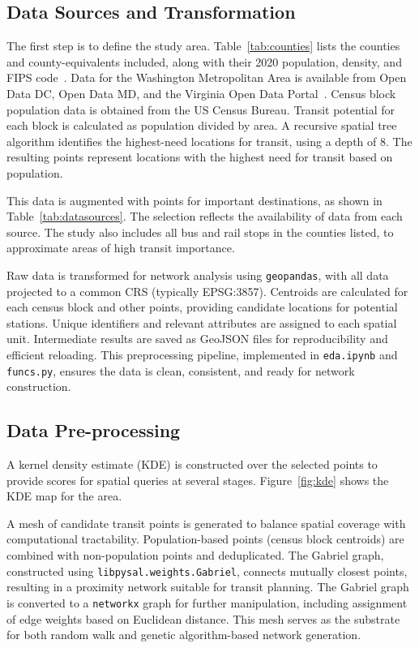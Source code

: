 \documentclass[manuscript]{acmart}
\begin{document}
\subsection{Data Sources and Transformation}
The first step is to define the study area. Table~\ref{tab:counties} lists the counties and county-equivalents included, along with their 2020 population, density, and FIPS code~\cite{lit:census}. Data for the Washington Metropolitan Area is available from Open Data DC, Open Data MD, and the Virginia Open Data Portal~\cite{lit:opendata}. Census block population data is obtained from the US Census Bureau. Transit potential for each block is calculated as population divided by area. A recursive spatial tree algorithm identifies the highest-need locations for transit, using a depth of 8. The resulting points represent locations with the highest need for transit based on population.

This data is augmented with points for important destinations, as shown in Table~\ref{tab:datasources}. The selection reflects the availability of data from each source. The study also includes all bus and rail stops in the counties listed, to approximate areas of high transit importance.

Raw data is transformed for network analysis using \texttt{geopandas}, with all data projected to a common CRS (typically EPSG:3857). Centroids are calculated for each census block and other points, providing candidate locations for potential stations. Unique identifiers and relevant attributes are assigned to each spatial unit. Intermediate results are saved as GeoJSON files for reproducibility and efficient reloading. This preprocessing pipeline, implemented in \texttt{eda.ipynb} and \texttt{funcs.py}, ensures the data is clean, consistent, and ready for network construction.

\subsection{Data Pre-processing}

A kernel density estimate (KDE) is constructed over the selected points to provide scores for spatial queries at several stages. Figure~\ref{fig:kde} shows the KDE map for the area.

A mesh of candidate transit points is generated to balance spatial coverage with computational tractability. Population-based points (census block centroids) are combined with non-population points and deduplicated. The Gabriel graph, constructed using \texttt{libpysal.weights.Gabriel}, connects mutually closest points, resulting in a proximity network suitable for transit planning. The Gabriel graph is converted to a \texttt{networkx} graph for further manipulation, including assignment of edge weights based on Euclidean distance. This mesh serves as the substrate for both random walk and genetic algorithm-based network generation.
\end{document}
